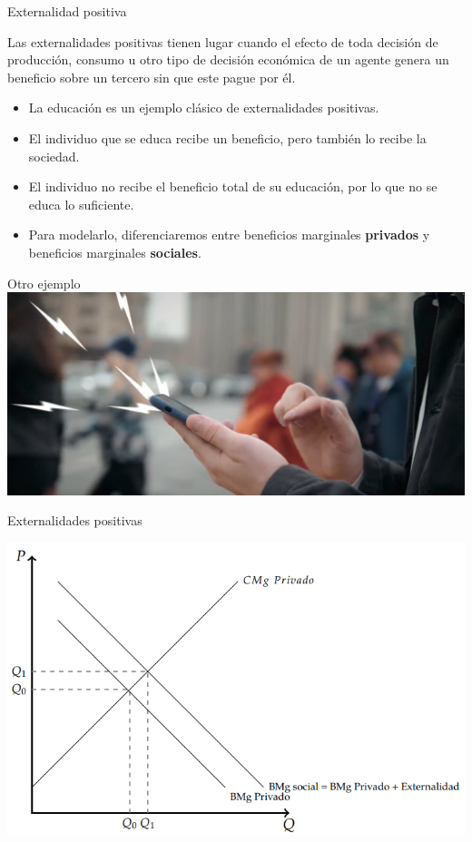 \documentclass{beamer}
\begin{document}
\begin{frame}{Externalidad positiva}
    \begin{boxA}
        Las externalidades positivas tienen lugar cuando el efecto de
        toda decisión de producción, consumo u otro tipo de decisión
        económica de un agente genera un beneficio sobre un tercero sin
        que este pague por él.
    \end{boxA}
    \begin{itemize}
        \item La educación es un ejemplo clásico de externalidades positivas.
        \item El individuo que se educa recibe un beneficio, pero también lo recibe la sociedad.
        \item El individuo no recibe el beneficio total de su educación, por lo que no se educa lo suficiente.
        \item Para modelarlo, diferenciaremos entre beneficios marginales \textbf{privados} y beneficios marginales \textbf{sociales}.
    \end{itemize}
\end{frame}

\begin{frame}{Otro ejemplo}
    \centering  
    \href{https://econ.video/2022/06/21/the-g-word-with-adam-conover-external-benefits-of-gps/}{\includegraphics[scale=0.35]{../Figures/ExternalidadPII.png}}  
\end{frame}

\begin{frame}{Externalidades positivas}
    \begin{center}
        \includegraphics[scale=0.7]{../Figures/C25.1.png}
    \end{center}
\end{frame}
\end{document}
